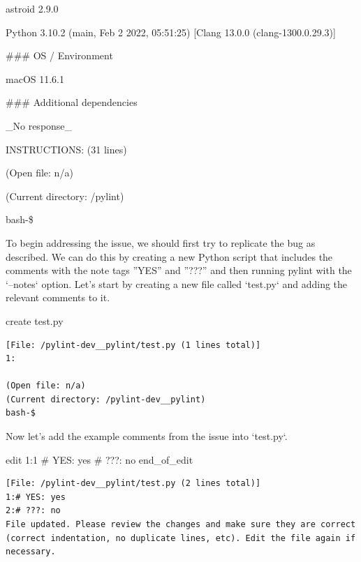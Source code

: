 {\begin{issuebox}
astroid 2.9.0

Python 3.10.2 (main, Feb  2 2022, 05:51:25) [Clang 13.0.0 (clang-1300.0.29.3)]

\begin{CodeVerbatim}[breaklines=true, breakanywhere=true]
### OS / Environment

macOS 11.6.1

### Additional dependencies

_No response_




INSTRUCTIONS: (31 lines)
\end{CodeVerbatim}
(Open file: n/a)

(Current directory: /pylint)

bash-\$

\end{issuebox}
\begin{agentbox}
To begin addressing the issue, we should first try to replicate the bug as described. We can do this by creating a new Python script that includes the comments with the note tags ''YES'' and ''???'' and then running pylint with the `--notes` option. Let's start by creating a new file called `test.py` and adding the relevant comments to it.



\hrulefill
\begin{CodeVerbatim}[breaklines=true, breakanywhere=true]
create test.py
\end{CodeVerbatim}
\end{agentbox}
\begin{observationbox}\begin{Verbatim}[breaklines=true, breakanywhere=true]
[File: /pylint-dev__pylint/test.py (1 lines total)]
1:

(Open file: n/a)
(Current directory: /pylint-dev__pylint)
bash-$
\end{Verbatim}
\end{observationbox}
\begin{agentbox}
Now let's add the example comments from the issue into `test.py`.



\hrulefill
\begin{CodeVerbatim}[breaklines=true, breakanywhere=true]
edit 1:1
# YES: yes
# ???: no
end_of_edit
\end{CodeVerbatim}
\end{agentbox}
\begin{observationbox}\begin{Verbatim}[breaklines=true, breakanywhere=true]
[File: /pylint-dev__pylint/test.py (2 lines total)]
1:# YES: yes
2:# ???: no
File updated. Please review the changes and make sure they are correct (correct indentation, no duplicate lines, etc). Edit the file again if necessary.


\end{Verbatim}
\end{observationbox}}
